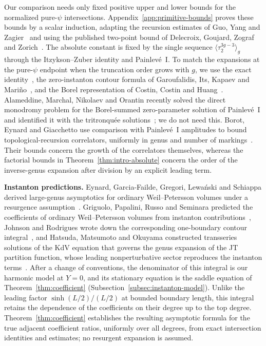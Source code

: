 Our comparison needs only fixed positive upper and lower bounds for the normalized pure-$\psi$ intersections. Appendix~\ref{app:primitive-bounds} proves these bounds by a scalar induction, adapting the recursion estimates of Guo, Yang and Zagier~\cite{GYZ} and using the published two-point bound of Delecroix, Goujard, Zograf and Zorich~\cite{DGZZBounds}. The absolute constant is fixed by the single sequence $\langle\tau_2^{3g-3}\rangle_g$ through the Itzykson--Zuber identity and Painlev\'e~I. To match the expansions at the pure-$\psi$ endpoint when the truncation order grows with $g$, we use the exact identity~\cite[equation~(6.10)]{IZ}, the zero-instanton contour formula of Garoufalidis, Its, Kapaev and Mari\~no~\cite{GIKM}, and the Borel representation of Costin, Costin and Huang~\cite{CCH}. Alameddine, Marchal, Nikolaev and Orantin recently solved the direct monodromy problem for the Borel-summed zero-parameter solution of Painlev\'e~I and identified it with the tritronqu\'ee solutions~\cite{AMNO}; we do not need this. Borot, Eynard and Giacchetto use comparison with Painlev\'e~I amplitudes to bound topological-recursion correlators, uniformly in genus and number of markings~\cite[Main Theorem and Section~1.3]{BEG}. Their bounds concern the growth of the correlators themselves, whereas the factorial bounds in Theorem~\ref{thm:intro-absolute} concern the order of the inverse-genus expansion after division by an explicit leading term.

\textbf{Instanton predictions.}\label{subsec:intro-instanton}
Eynard, Garcia-Failde, Gregori, Lewa\'nski and Schiappa derived large-genus asymptotics for ordinary Weil--Petersson volumes under a resurgence assumption~\cite{EGGLS}. Griguolo, Papalini, Russo and Seminara predicted the coefficients of ordinary Weil--Petersson volumes from instanton contributions~\cite[Section~3.3]{GPRS}, Johnson and Rodrigues wrote down the corresponding one-boundary contour integral~\cite[equation~(4.22)]{JR}, and Hatsuda, Matsumoto and Okuyama constructed transseries solutions of the KdV equation that governs the genus expansion of the JT partition function, whose leading nonperturbative sector reproduces the instanton terms~\cite{HMO}. After a change of conventions, the denominator of this integral is our harmonic model at $Y=0$, and its stationary equation is the saddle equation of Theorem~\ref{thm:coefficient} (Subsection~\ref{subsec:instanton-model}). Unlike the leading factor $\sinh(L/2)/(L/2)$ at bounded boundary length, this integral retains the dependence of the coefficients on their degree up to the top degree. Theorem~\ref{thm:coefficient} establishes the resulting asymptotic formula for the true adjacent coefficient ratios, uniformly over all degrees, from exact intersection identities and estimates; no resurgent expansion is assumed.

